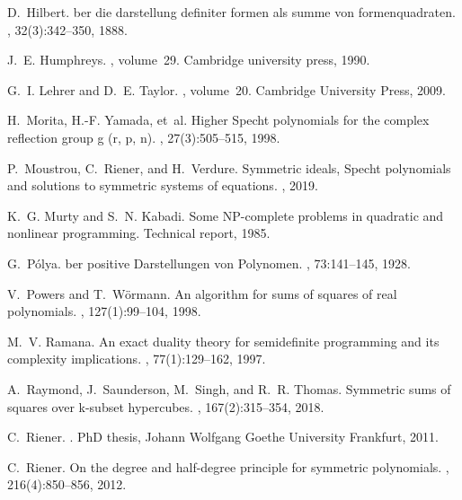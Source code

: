 \documentclass[11pt,a4paper]{amsart}
\numberwithin{equation}{section}
\theoremstyle{definition}
\numberwithin{thm}{section}
\theoremstyle{break}
\numberwithin{subcase}{case}
\begin{document}
\begin{thebibliography}{10}
D.~Hilbert.
ber die darstellung definiter formen als summe von
  formenquadraten.
, 32(3):342--350, 1888.

J.~E. Humphreys.
, volume~29.
\newblock Cambridge university press, 1990.

G.~I. Lehrer and D.~E. Taylor.
, volume~20.
\newblock Cambridge University Press, 2009.

H.~Morita, H.-F. Yamada, et~al.
\newblock Higher Specht polynomials for the complex reflection group g (r, p,
  n).
, 27(3):505--515, 1998.

P.~Moustrou, C.~Riener, and H.~Verdure.
\newblock Symmetric ideals, Specht polynomials and solutions to symmetric
  systems of equations.
, 2019.

K.~G. Murty and S.~N. Kabadi.
\newblock Some NP-complete problems in quadratic and nonlinear programming.
\newblock Technical report, 1985.

G.~P{\'o}lya.
ber positive Darstellungen von Polynomen.
, 73:141--145, 1928.

V.~Powers and T.~W{\"o}rmann.
\newblock An algorithm for sums of squares of real polynomials.
, 127(1):99--104, 1998.

M.~V. Ramana.
\newblock An exact duality theory for semidefinite programming and its
  complexity implications.
, 77(1):129--162, 1997.

A.~Raymond, J.~Saunderson, M.~Singh, and R.~R. Thomas.
\newblock Symmetric sums of squares over k-subset hypercubes.
, 167(2):315--354, 2018.

C.~Riener.
.
\newblock PhD thesis, Johann Wolfgang Goethe University Frankfurt, 2011.

C.~Riener.
\newblock On the degree and half-degree principle for symmetric polynomials.
, 216(4):850--856, 2012.


\end{thebibliography}
\end{document}
